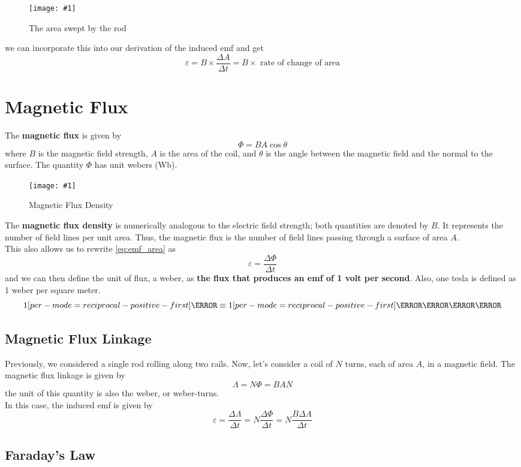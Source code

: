 \documentclass[a4paper,12pt]{article}
\let\oldsection\section
\renewcommand\section{\clearpage\oldsection}
\let\oldsi\si
\renewcommand{\si}[1]{\oldsi[per-mode=reciprocal-positive-first]{#1}}
\newcommand{\lb}{\\[8pt]}
\newcommand{\img}[4]{\begin{center}
  \begin{figure}[H]
    \centering
    \texttt{[image: \#1]}
    \caption{#3}
    \label{fig:#4}
  \end{figure}
\end{center}}
\begin{document}
\img{rollingarea.png}{0.6}{The area swept by the rod}{rollingarea}
we can incorporate this into our derivation of the induced emf and get
\begin{equation}\label{eq:emf_area}
  \varepsilon = B\times \frac{\Delta A}{\Delta t} = B \times \text{ rate of change of area}
\end{equation}

\pagebreak

\section{Magnetic Flux}

The \textbf{magnetic flux} is given by $$\Phi = BA\cos\theta$$where $B$ is the magnetic field strength, $A$ is the area of the coil, and $\theta$ is the angle between the magnetic field and the normal to the surface. The quantity $\Phi$ has unit webers (Wb).

\img{fluxdensity.png}{1}{Magnetic Flux Density}{fluxdensity}

The \textbf{magnetic flux density} is numerically analogous to the electric field strength; both quantities are denoted by $B$. It represents the number of field lines per unit area. Thus, the magnetic flux is the number of field lines passing through a surface of area $A$.\lb
This also allows us to rewrite \cref{eq:emf_area} as $$\varepsilon = \frac{\Delta \Phi}{\Delta t}$$
and we can then define the unit of flux, a weber, as \textbf{the flux that produces an emf of 1 volt per second}.
Also, one tesla is defined as 1 weber per square meter.
$$1\si{\tesla}\equiv 1\si{\weber\per\m\squared}$$

\pagebreak

\subsection{Magnetic Flux Linkage}

Previously, we considered a single rod rolling along two rails. Now, let's consider a coil of $N$ turns, each of area $A$, in a magnetic field. The magnetic flux linkage is given by $$\Lambda = N\Phi = BAN$$
the unit of this quantity is also the weber, or weber-turns.\lb
In this case, the induced emf is given by $$\varepsilon = \frac{\Delta \Lambda}{\Delta t} = N\frac{\Delta \Phi}{\Delta t} = N\frac{B\Delta A}{\Delta t}$$

\subsection{Faraday's Law}
\end{document}

